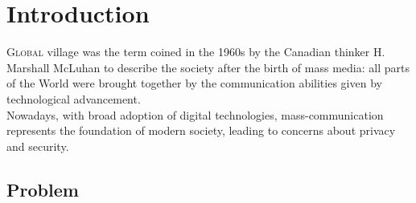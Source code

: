 \chapter{Introduction}
\label{chap:intro}

\lettrine[lines=3, findent=3pt, nindent=0pt]{G}{lobal} village was the term coined in the 1960s by the Canadian thinker H. Marshall McLuhan \cite{mcluhan1962} to describe the society after the birth of mass media: all parts of the World were brought together by the communication abilities given by technological advancement. \\
Nowadays, with broad adoption of digital technologies, mass-communication represents the foundation of modern society, leading to concerns about privacy and security.




\section{Problem}
\label{sec:problem}

